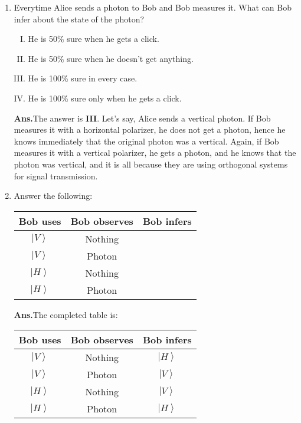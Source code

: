 \documentclass[12pt]{article}
\newcommand\rr{\right \rangle}
\newcommand\ls{\left |}
\newcommand\tbf[1]{\textbf{#1}}
\newcommand\tans{\tbf{Ans.}}
\begin{document}
\begin{enumerate}[1.]
\item Everytime Alice sends a photon to Bob and Bob measures it. What can Bob infer about the state of the photon?
\begin{enumerate}[I.]
\item He is 50\% sure when he gets a click.
\item He is 50\% sure when he doesn't get anything.
\item He is 100\% sure in every case.
\item He is 100\% sure only when he gets a click. \newline
\end{enumerate}
\tans The answer is \tbf{III}. Let's say, Alice sends a vertical photon. If Bob measures it with a horizontal polarizer, he does not get a photon, hence he knows immediately that the original photon was a vertical. Again, if Bob measures it with a vertical polarizer, he gets a photon, and he knows that the photon was vertical, and it is all because they are using orthogonal systems for signal transmission. \newline
\item Answer the following:
{\begin{center}
\begin{tabular}{|c|c|c|}
\hline
Bob uses & Bob observes & Bob infers \\
\hline
$\ls V \rr$ & Nothing & \phantom{$\ls H \rr$} \\
$\ls V \rr$ & Photon & \phantom{$\ls V \rr$} \\
$\ls H \rr$ & Nothing & \phantom{$\ls V \rr$} \\
$\ls H \rr$ & Photon & \phantom{$\ls H \rr$} \\
\hline
\end{tabular}
\end{center}}
\tans The completed table is:
{\begin{center}
\begin{tabular}{|c|c|c|}
\hline
Bob uses & Bob observes & Bob infers \\
\hline
$\ls V \rr$ & Nothing & {$\ls H \rr$} \\
$\ls V \rr$ & Photon & {$\ls V \rr$} \\
$\ls H \rr$ & Nothing & {$\ls V \rr$} \\
$\ls H \rr$ & Photon & {$\ls H \rr$} \\
\hline
\end{tabular}
\end{center}}	

\end{enumerate}
\end{document}
